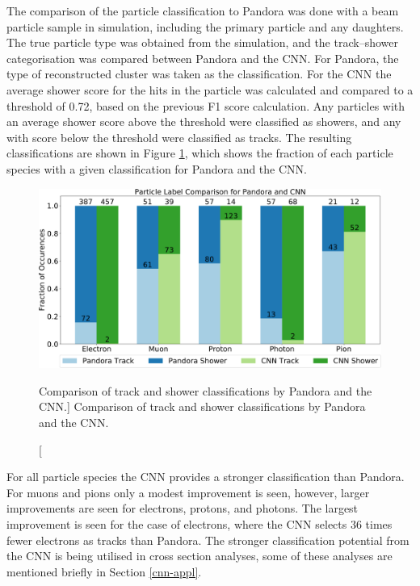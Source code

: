 The comparison of the particle classification to Pandora was done with a beam 
particle sample in \protodune{} simulation, including the primary particle and 
any daughters. The true particle type was obtained from the simulation, and 
the track--shower categorisation was compared between Pandora and the CNN. For 
Pandora, the type of reconstructed cluster was taken as the classification. 
For the CNN the average shower score for the hits in the particle was 
calculated and compared to a threshold of 0.72, based on the previous F1 score 
calculation. Any particles with an average shower score above the threshold were
classified as showers, and any with score below the threshold were classified 
as tracks. The resulting classifications are shown in Figure 
\ref{fig:track_show_pan_cnn}, which shows the fraction of each particle 
species with a given classification for Pandora and the CNN.
\begin{figure}
	\centering
	\includegraphics[width=\textwidth]{figures/track_shower_labels.pdf}
	\caption
	[Comparison of track and shower classifications by Pandora and the CNN.]
	{Comparison of track and shower classifications by Pandora and the CNN.}
	\label{fig:track_show_pan_cnn}
\end{figure}

For all particle species the CNN provides a stronger classification than
Pandora. For muons and pions only a modest improvement is seen, however, larger
improvements are seen for electrons, protons, and photons. The largest 
improvement is seen for the case of electrons, where the CNN selects 36 times 
fewer electrons as tracks than Pandora. The stronger classification potential 
from the CNN is being utilised in \protodune{} cross section analyses, some of 
these analyses are mentioned briefly in Section \ref{cnn-appl}.

